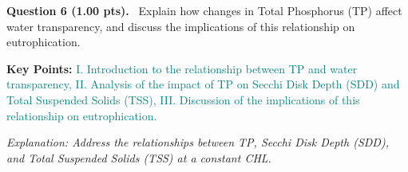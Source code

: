 \documentclass[12pt,a4paper]{article}
\begin{document}
\noindent
\textbf{Question 6 (1.00 pts).}~
Explain how changes in Total Phosphorus (TP) affect water transparency, and discuss the implications of this relationship on eutrophication.


\textbf{Key Points:} \textcolor{teal}{I. Introduction to the relationship between TP and water transparency, II. Analysis of the impact of TP on Secchi Disk Depth (SDD) and Total Suspended Solids (TSS), III. Discussion of the implications of this relationship on eutrophication.}



\textit{\small Explanation: Address the relationships between TP, Secchi Disk Depth (SDD), and Total Suspended Solids (TSS) at a constant CHL.}
\end{document}

